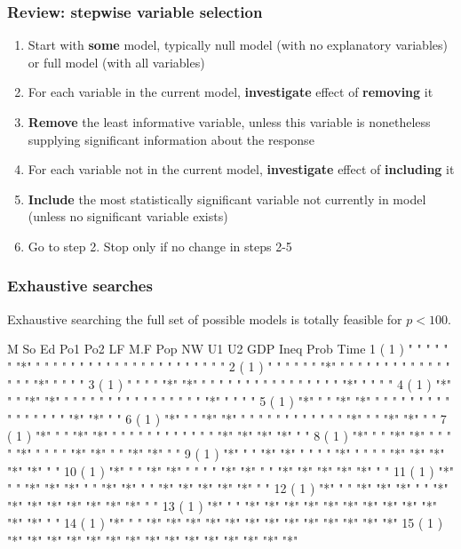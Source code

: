 \documentclass[a4paper]{article}\usepackage[]{graphicx}\usepackage[]{xcolor}
\begin{document}
\subsubsection{Review: stepwise variable selection}
\begin{enumerate}
	\item Start with \textcolor{myred}{\textbf{some}} model, typically null model (with no explanatory variables) or full model (with all variables)
	\item For each variable in the current model, \textcolor{myred}{\textbf{investigate}} effect of \textcolor{myred}{\textbf{removing}} it
	\item \textcolor{myred}{\textbf{Remove}} the least informative variable, unless this variable is nonetheless supplying significant information about the response
	\item For each variable not in the current model, \textcolor{myred}{\textbf{investigate}} effect of \textcolor{myred}{\textbf{including}} it
	\item \textcolor{myred}{\textbf{Include}} the most statistically significant variable not currently in model (unless no significant variable exists)
	\item Go to step 2. Stop only if no change in steps 2-5
\end{enumerate}
\subsubsection{Exhaustive searches}
Exhaustive searching the full set of possible models is totally feasible for \( p < 100 \).
\begin{Schunk}
\begin{Soutput}
          M   So  Ed  Po1 Po2 LF  M.F Pop NW  U1  U2  GDP Ineq Prob Time
1  ( 1 )  " " " " " " "*" " " " " " " " " " " " " " " " " " "  " "  " " 
2  ( 1 )  " " " " " " "*" " " " " " " " " " " " " " " " " "*"  " "  " " 
3  ( 1 )  " " " " "*" "*" " " " " " " " " " " " " " " " " "*"  " "  " " 
4  ( 1 )  "*" " " "*" "*" " " " " " " " " " " " " " " " " "*"  " "  " " 
5  ( 1 )  "*" " " "*" "*" " " " " " " " " " " " " " " " " "*"  "*"  " " 
6  ( 1 )  "*" " " "*" "*" " " " " " " " " " " " " "*" " " "*"  "*"  " " 
7  ( 1 )  "*" " " "*" "*" " " " " " " " " " " " " "*" "*" "*"  "*"  " " 
8  ( 1 )  "*" " " "*" "*" " " " " "*" " " " " "*" "*" " " "*"  "*"  " " 
9  ( 1 )  "*" " " "*" "*" " " " " "*" " " " " "*" "*" "*" "*"  "*"  " " 
10  ( 1 ) "*" " " "*" "*" " " " " "*" "*" " " "*" "*" "*" "*"  "*"  " " 
11  ( 1 ) "*" " " "*" "*" "*" " " "*" "*" " " "*" "*" "*" "*"  "*"  " " 
12  ( 1 ) "*" " " "*" "*" "*" " " "*" "*" "*" "*" "*" "*" "*"  "*"  " " 
13  ( 1 ) "*" " " "*" "*" "*" "*" "*" "*" "*" "*" "*" "*" "*"  "*"  " " 
14  ( 1 ) "*" " " "*" "*" "*" "*" "*" "*" "*" "*" "*" "*" "*"  "*"  "*" 
15  ( 1 ) "*" "*" "*" "*" "*" "*" "*" "*" "*" "*" "*" "*" "*"  "*"  "*" 
\end{Soutput}
\end{Schunk}
\end{document}
